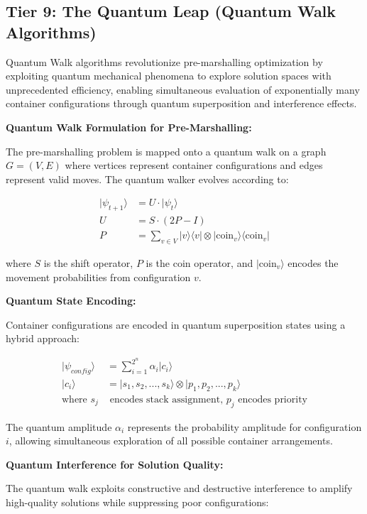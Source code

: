 \documentclass{article}
\begin{document}
\subsection{Tier 9: The Quantum Leap (Quantum Walk Algorithms)}

Quantum Walk algorithms revolutionize pre-marshalling optimization by exploiting quantum mechanical phenomena to explore solution spaces with unprecedented efficiency, enabling simultaneous evaluation of exponentially many container configurations through quantum superposition and interference effects.

\textbf{Quantum Walk Formulation for Pre-Marshalling:}

The pre-marshalling problem is mapped onto a quantum walk on a graph $G = (V, E)$ where vertices represent container configurations and edges represent valid moves. The quantum walker evolves according to:

\begin{align}
|\psi_{t+1}\rangle &= U \cdot |\psi_t\rangle \\
U &= S \cdot (2P - I) \\
P &= \sum_{v \in V} |v\rangle\langle v| \otimes |\text{coin}_v\rangle\langle\text{coin}_v|
\end{align}

where $S$ is the shift operator, $P$ is the coin operator, and $|\text{coin}_v\rangle$ encodes the movement probabilities from configuration $v$.

\textbf{Quantum State Encoding:}

Container configurations are encoded in quantum superposition states using a hybrid approach:

\begin{align}
|\psi_{config}\rangle &= \sum_{i=1}^{2^n} \alpha_i |c_i\rangle \\
|c_i\rangle &= |s_1, s_2, ..., s_k\rangle \otimes |p_1, p_2, ..., p_k\rangle \\
\text{where } s_j &\text{ encodes stack assignment, } p_j \text{ encodes priority}
\end{align}

The quantum amplitude $\alpha_i$ represents the probability amplitude for configuration $i$, allowing simultaneous exploration of all possible container arrangements.

\textbf{Quantum Interference for Solution Quality:}

The quantum walk exploits constructive and destructive interference to amplify high-quality solutions while suppressing poor configurations:
\end{document}
